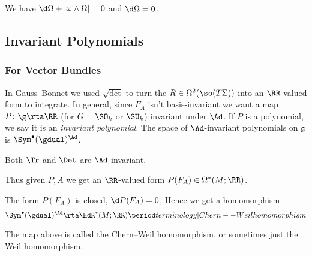\begin{thm}
	We have $\d\Omega+[\omega\wedge\Omega]=0$ and $\d\Omega=0$. 
\end{thm}


\subsection{Invariant Polynomials}

\subsubsection{For Vector Bundles}

In Gauss--Bonnet we used $\sqrt{\det}$ to turn the $R\in\Omega^2(\so(T\Sigma))$ into an $\RR$-valued form to integrate. In general, since $F_A$ isn't basis-invariant we want a map $P\colon\g\rta\RR$ (for $G=\SO_k$ or $\SU_k$) invariant under $\Ad$. If $P$ is a polynomial, we say it is an \emph{invariant polynomial}. 
The space of $\Ad$-invariant polynomials on $\mathfrak{g}$ is $\Sym^\bullet(\gdual)^{\Ad}$. 

\begin{ex}
	Both $\Tr$ and $\Det$ are $\Ad$-invariant. 
\end{ex}

\noindent Thus given $P,A$ we get an $\RR$-valued form $P(F_A)\in\Omega^*(M;\RR)$. 


\begin{prop}
The form $P(F_A)$ is closed, $\d P(F_A)=0$, 
Hence we get a homomorphism
	\[
		\Sym^\bullet(\gdual)^{\Ad}\rta \HdR^*(M;\RR) \period  \index[terminology]{Chern--Weil homomorphism} 
	\]
\end{prop}
 The map above is called the Chern--Weil homomorphism, or sometimes just the Weil homomorphism.

